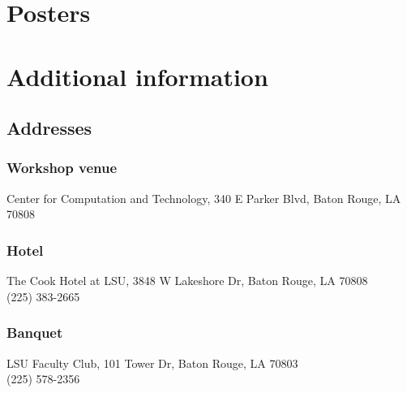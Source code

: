 \documentclass[12pt]{book}
\newenvironment{conf-abstract}[4][]{
  \needspace{10\baselineskip}
  \begin{center}
    { \renewcommand\textsuperscript[1]{}
      \phantomsection\addcontentsline{toc}{section}
      {\texorpdfstring{#2 (\emph{#3})}{#2 (#3)}}
    }
    {{\large\bfseries #2}\marginnote{#1}\par}
    \medskip
    {#3\par}
    \smallskip
    {\small #4\par}
  \end{center}
}{%
  \bigskip
  \hrule
  \bigskip
}
\newcommand{\indexauthors}[1]{%
  \forcsvlist{\index}{#1}
}
\begin{document}
\chapter{Posters}

{
\begin{conf-abstract}[\datum\\\time]
{\title}
{\first~ \last}
{\affiliation}
\indexauthors{\last!\first}
\text
\end{conf-abstract}
}


%

%
%
%

\chapter{Additional information}

\section{Addresses}

\subsection*{Workshop venue}
Center for Computation and Technology, 340 E Parker Blvd, Baton Rouge, LA 70808 
\subsection*{Hotel}
The Cook Hotel at LSU, 3848 W Lakeshore Dr, Baton Rouge, LA 70808 \\
(225) 383-2665
\subsection*{Banquet}
LSU Faculty Club, 101 Tower Dr, Baton Rouge, LA 70803 \\
(225) 578-2356
\end{document}
